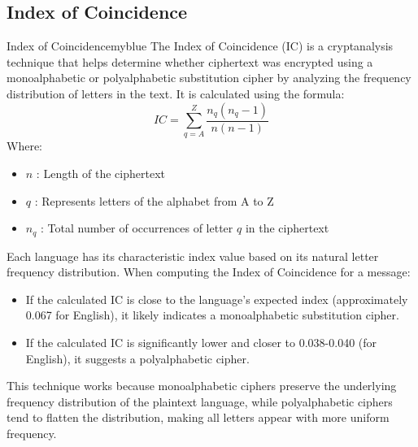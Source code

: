 \subsection{Index of Coincidence}
\begin{prettyBox}{Index of Coincidence}{myblue}
The Index of Coincidence (IC) is a cryptanalysis technique that helps determine whether ciphertext was encrypted using a monoalphabetic or polyalphabetic
substitution cipher by analyzing the frequency distribution of letters in the text. It is calculated using the formula:
\[ IC = \sum_{q=A} ^{Z} \frac{n_q(n_q-1)}{n(n-1)}\]
Where:
\begin{itemize}
\item \(n\) : Length of the ciphertext
\item \(q\) : Represents letters of the alphabet from A to Z
\item \(n_q\) : Total number of occurrences of letter \(q\) in the ciphertext
\end{itemize}
Each language has its characteristic index value based on its natural letter frequency distribution. When computing the Index of Coincidence for a message:
\begin{itemize}
\item If the calculated IC is close to the language's expected index (approximately 0.067 for English), it likely indicates a monoalphabetic substitution cipher.
\item If the calculated IC is significantly lower and closer to 0.038-0.040 (for English), it suggests a polyalphabetic cipher.
\end{itemize}
This technique works because monoalphabetic ciphers preserve the underlying frequency distribution of the plaintext language, while polyalphabetic ciphers tend to flatten the distribution, making all letters appear with more uniform frequency.
\end{prettyBox}

